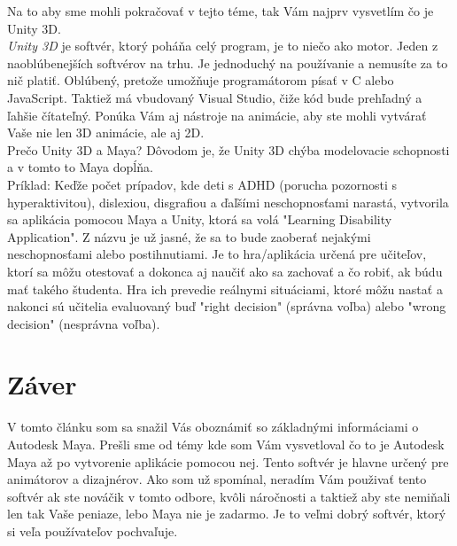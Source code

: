 \documentclass[10pt,oneside,slovak,a4paper]{article}
\begin{document}
Na to aby sme mohli pokračovať v tejto téme, tak Vám najprv vysvetlím čo je Unity 3D.\\

\emph{Unity 3D} je softvér, ktorý poháňa celý program, je to niečo ako motor. Jeden z naoblúbenejších softvérov na trhu. Je jednoduchý na používanie a nemusíte za to nič platiť. Oblúbený, pretože umožňuje programátorom písať v C alebo JavaScript. Taktiež má vbudovaný Visual Studio, čiže kód bude prehľadný a ľahšie čítateľný. Ponúka Vám aj nástroje na animácie, aby ste mohli vytvárať Vaše nie len 3D animácie, ale aj 2D.\\

Prečo Unity 3D a Maya? Dôvodom je, že Unity 3D chýba modelovacie schopnosti a v tomto to Maya dopĺňa.\cite{labschutz2011content}\\

Príklad:
Keďže počet prípadov, kde deti s ADHD (porucha pozornosti s hyperaktivitou), dislexiou, disgrafiou a ďaľšími neschopnosťami narastá, vytvorila sa aplikácia pomocou Maya a Unity, ktorá sa volá "Learning Disability Application". Z názvu je už jasné, že sa to bude zaoberať nejakými neschopnosťami alebo postihnutiami. Je to hra/aplikácia určená pre učiteľov, ktorí sa môžu otestovať a dokonca aj naučiť ako sa zachovať a čo robiť, ak búdu mať takého študenta. Hra ich prevedie reálnymi situáciami, ktoré môžu nastať a nakonci sú učitelia evaluovaný buď "right decision" (správna voľba) alebo "wrong decision" (nesprávna voľba)\cite{studies}.



\section{Záver} \label{zaver}

V tomto článku som sa snažil Vás oboznámiť so základnými informáciami o Autodesk Maya. Prešli sme od témy kde som Vám vysvetloval čo to je Autodesk Maya až po vytvorenie aplikácie pomocou nej. Tento softvér je hlavne určený pre animátorov a dizajnérov. Ako som už spomínal, neradím Vám použivať tento softvér ak ste nováčik v tomto odbore, kvôli náročnosti a taktiež aby ste nemiňali len tak Vaše peniaze, lebo Maya nie je zadarmo. Je to veľmi dobrý softvér, ktorý si veľa používateľov pochvaľuje. 


 
\end{document}
